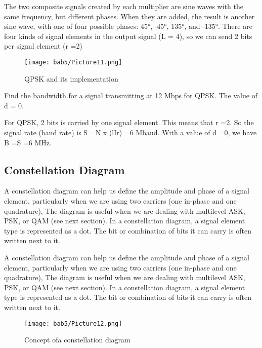 The two composite signals created by each multiplier are sine waves with the same frequency, but different phases. When they are added, the result is another sine wave, with one of four possible phases: 45°, -45°, 135°, and -135°. There are four kinds of signal elements in the output signal (L = 4), so we can send 2 bits per signal element (r =2)

\begin{figure}[htbp]
  \centering
  \texttt{[image: bab5/Picture11.png]}
  \caption{QPSK and its implementation}
  \label{fig5:11}
\end{figure}

\begin{example}
  Find the bandwidth for a signal transmitting at 12 Mbps for QPSK. The value of d = 0.
\end{example}

\begin{solution}
  For QPSK, 2 bits is carried by one signal element. This means that r =2. So the signal rate (baud rate) is S =N x (lIr) =6 Mbaud. With a value of d =0, we have B =S =6 MHz.
\end{solution}

\subsection*{Constellation Diagram}
A constellation diagram can help us define the amplitude and phase of a signal element, particularly when we are using two carriers (one in-phase and one quadrature), The diagram is useful when we are dealing with multilevel ASK, PSK, or QAM (see next section). In a constellation diagram, a signal element type is represented as a dot. The bit or combination of bits it can carry is often written next to it.

A constellation diagram can help us define the amplitude and phase of a signal element, particularly when we are using two carriers (one in-phase and one quadrature), The diagram is useful when we are dealing with multilevel ASK, PSK, or QAM (see next section). In a constellation diagram, a signal element type is represented as a dot. The bit or combination of bits it can carry is often written next to it.

\begin{figure}[htbp]
  \centering
  \texttt{[image: bab5/Picture12.png]}
  \caption{Concept ofa constellation diagram}
  \label{fig5:12}
\end{figure}

